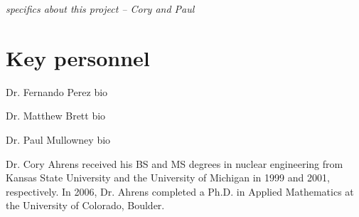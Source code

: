 \documentclass[10pt]{article}
\begin{document}
\emph{specifics about this project -- Cory and Paul}

\section*{Key personnel}

Dr. Fernando Perez bio

Dr. Matthew Brett bio

Dr. Paul Mullowney bio

Dr. Cory Ahrens received his BS and MS degrees in nuclear engineering from Kansas State University and the University of Michigan in 1999 and 2001, respectively. In 2006, Dr. Ahrens completed a Ph.D. in Applied Mathematics at the University of Colorado, Boulder.



 
\end{document}
